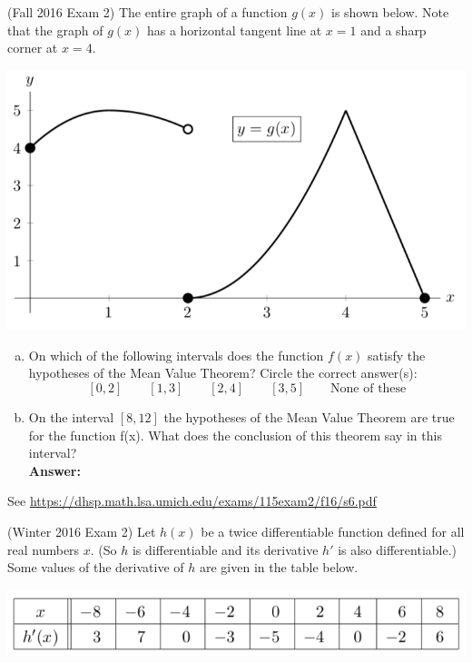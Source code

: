 \documentclass[11pt]{exam}
\begin{document}
\begin{questions}
                \question (Fall 2016 Exam 2)
The entire graph of a function \(g(x)\) is shown below. Note that the graph of \(g(x)\)
has a horizontal tangent line at \(x = 1\) and a sharp corner at \(x = 4\).
\begin{center}
  \includegraphics[scale=0.4]{Fall2016Exam2Problem6}
\end{center}
\begin{enumerate}[(a)]
\item On which of the following intervals does the function \(f(x)\) satisfy the hypotheses of
  the Mean Value Theorem? Circle the correct answer(s): \[
[0,2] \qquad [1,3] \qquad [2,4] \qquad [3,5] \qquad \textrm{None of these}
  \]
\item On the interval \([8, 12]\) the hypotheses of the Mean Value Theorem are true for the
function f(x). What does the conclusion of this theorem say in this interval?\\
{\bf Answer:}
\vspace{0.5in}
\end{enumerate}
\begin{solution}
  See \href{https://dhsp.math.lsa.umich.edu/exams/115exam2/f16/s6.pdf}{https://dhsp.math.lsa.umich.edu/exams/115exam2/f16/s6.pdf}
\end{solution}
\question (Winter 2016 Exam 2) Let $h(x)$ be a twice differentiable function defined for all real numbers $x$. (So $h$ is differentiable and its derivative $h'$ is also differentiable.)
Some values of the derivative of $h$ are given in the table below.
\begin{center}
  \includegraphics[scale=0.5]{Winter2016Exam2Problem4}
\end{center}


\end{questions}
\end{document}
